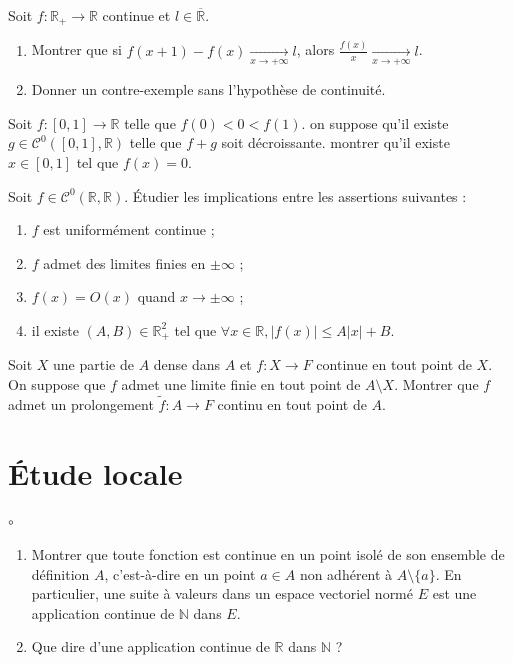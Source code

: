 \documentclass[french,a4paper]{article}
\newcommand{\N}{\mathbb{N}}
\newcommand{\R}{\mathbb{R}}
\theoremstyle{plain}
\theoremstyle{definition}
\theoremstyle{remark}
\begin{document}
\begin{ex}{}
	Soit $f:\R_+\to\R$ continue et $l\in\overline{\R}$.
	\begin{enumerate}
		\item Montrer que si $f(x+1)-f(x)\xrightarrow[x\to+\infty]{}l$, alors $\displaystyle\frac{f(x)}{x}\xrightarrow[x\to+\infty]{}l$.
		\item Donner un contre-exemple sans l'hypothèse de continuité.
	\end{enumerate}
\end{ex}

\begin{ex}{}
	Soit $f:[0,1]\to\R$ telle que $f(0)<0<f(1)$. on suppose qu'il existe $g\in\mathcal{C}^0([0,1],\R)$ telle que $f+g$ soit décroissante. montrer qu'il existe $x\in[0,1]$ tel que $f(x)=0$.
\end{ex}

\begin{ex}{}
	Soit $f\in\mathcal{C}^0(\R,\R)$. Étudier les implications entre les assertions suivantes :
	\begin{enumerate}[label=(\roman*)]
		\item $f$ est uniformément continue ;
		\item $f$ admet des limites finies en $\pm\infty$ ;
		\item $f(x)=O(x)$ quand $x\to\pm\infty$ ;
		\item il existe $(A,B)\in\R_+^2$ tel que $\forall x\in\R, \lvert f(x)\rvert\leqslant A\lvert x\rvert+B$.
	\end{enumerate}
\end{ex}

\begin{ex}{}
	Soit $X$ une partie de $A$ dense dans $A$ et $f:X\to F$ continue en tout point de $X$. On suppose que $f$ admet une limite finie en tout point de $A\setminus X$. Montrer que $f$ admet un prolongement $\tilde{f}:A\to F$ continu en tout point de $A$.
\end{ex}

\section{Étude locale}

\begin{ex}{$\circ$}
	\begin{enumerate}
		\item Montrer que toute fonction est continue en un point isolé de son ensemble de définition $A$, c'est-à-dire en un point $a\in A$ non adhérent à $A\setminus\{a\}$. En particulier, une suite à valeurs dans un espace vectoriel normé $E$ est une application continue de $\N$ dans $E$.
		\item Que dire d'une application continue de $\R$ dans $\N$ ?
	\end{enumerate}
\end{ex}
\end{document}
